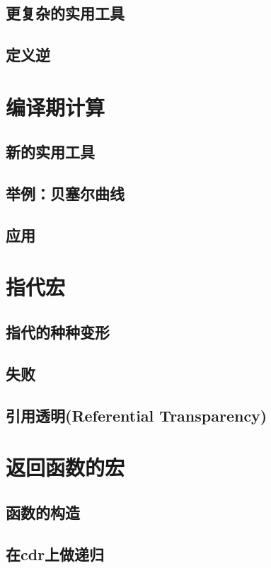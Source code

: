\documentclass{ctexart}
\begin{document}
\subsection{更复杂的实用工具}
\label{sec-12-4}
\subsection{定义逆}
\label{sec-12-5}
\section{编译期计算}
\label{sec-13}
\subsection{新的实用工具}
\label{sec-13-1}
\subsection{举例：贝塞尔曲线}
\label{sec-13-2}
\subsection{应用}
\label{sec-13-3}
\section{指代宏}
\label{sec-14}
\subsection{指代的种种变形}
\label{sec-14-1}
\subsection{失败}
\label{sec-14-2}
\subsection{引用透明(Referential Transparency)}
\label{sec-14-3}
\section{返回函数的宏}
\label{sec-15}
\subsection{函数的构造}
\label{sec-15-1}
\subsection{在cdr上做递归}
\label{sec-15-2}
\end{document}
